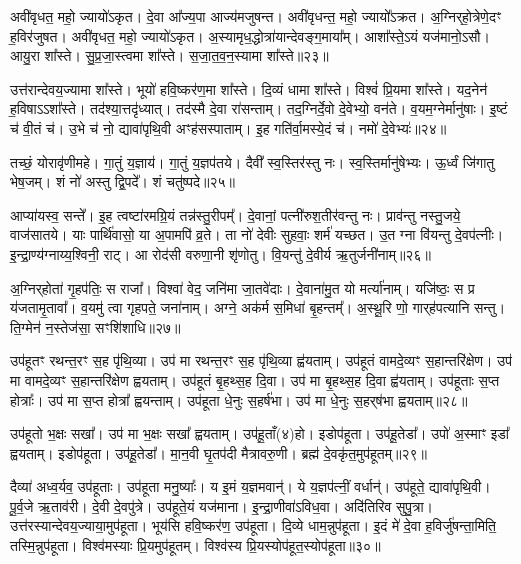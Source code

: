 अवी॑वृधत॒ महो॒ ज्यायो॑ऽकृत।
दे॒वा आ᳚ज्य॒पा आज्य॑मजुषन्त।
अवी॑वृधन्त॒ महो॒ ज्यायो᳚\-ऽक्रत।
अ॒ग्निर्‌\mbox{}हो॒त्रेणे॒दꣳ ह॒विर॑जुषत।
अवी॑वृधत॒ महो॒ ज्यायो॑ऽकृत।
अ॒स्यामृध॒द्धोत्रा॑यान्देवङ्ग॒माया᳚म्।
आशा᳚स्ते॒ऽयं यज॑मानो॒ऽसौ।
आयु॒रा शा᳚स्ते।
सु॒प्र॒जा॒स्त्वमा शा᳚स्ते।
स॒जा॒त॒व॒न॒स्यामा शा᳚स्ते॥२३॥

उत्त॑रान्देवय॒ज्यामा शा᳚स्ते।
भूयो॑ हवि॒ष्कर॑ण॒मा शा᳚स्ते।
दि॒व्यं धामा शा᳚स्ते।
विश्वं॑ प्रि॒यमा शा᳚स्ते।
यद॒नेन॑ ह॒विषा\-ऽऽशा᳚स्ते।
तद॑श्या॒त्तदृ॑ध्यात्।
तद॑स्मै दे॒वा रा॑सन्ताम्।
तद॒ग्निर्दे॒वो दे॒वेभ्यो॒ वन॑ते।
व॒यम॒ग्नेर्मानु॑षाः।
इ॒ष्टं च॑ वी॒तं च॑।
उ॒भे च॑ नो॒ द्यावा॑पृथि॒वी अꣳह॑सस्पाताम्।
इ॒ह गति॑र्वा॒मस्ये॒दं च॑।
नमो॑ दे॒वेभ्यः॑॥२४॥\anuvakamend[अ॒भ॒यं॒ कृता॑वकृता॒ग्निरि॒दꣳ ह॒विर॑जुषत महे॒न्द्र इ॒दꣳ ह॒विर॑जुषत सजातवन॒स्यामा शा᳚स्ते वी॒तं च॒ त्रीणि॑ च]

तच्छं॒ योरावृ॑णीमहे।
गा॒तुं य॒ज्ञाय॑।
गा॒तुं य॒ज्ञप॑तये।
दैवी᳚ स्व॒स्तिर॑स्तु नः।
स्व॒स्तिर्मानु॑षेभ्यः।
ऊ॒र्ध्वं जि॑गातु भेष॒जम्।
शं नो॑ अस्तु द्वि॒पदे᳚।
शं चतु॑ष्पदे॥२५॥\anuvakamend[तच्छं॒ योर॒ष्टौ]

आप्या॑यस्व॒ सन्ते᳚।
इ॒ह त्वष्टा॑रमग्रि॒यं तन्न॑स्तु॒रीपम्᳚।
दे॒वानां॒ पत्नी॑रुश॒तीर॑वन्तु नः।
प्राव॑न्तु नस्तु॒जये॒ वाज॑सातये।
याः पार्थि॑वासो॒ या अ॒पामपि॑ व्र॒ते।
ता नो॑ देवीः सुहवाः॒ शर्म॑ यच्छत।
उ॒त ग्ना वि॑यन्तु दे॒वप॑त्नीः।
इ॒न्द्रा॒ण्य॑ग्नाय्य॒श्विनी॒ राट्।
आ रोद॑सी वरुणा॒नी शृ॑णोतु।
वि॒यन्तु॑ दे॒वीर्य ऋ॒तुर्जनी॑नाम्॥२६॥

अ॒ग्निर्‌\mbox{}होता॑ गृ॒हप॑तिः॒ स राजा᳚।
विश्वा॑ वेद॒ जनि॑मा जा॒तवे॑दाः।
दे॒वाना॑मु॒त यो मर्त्या॑नाम्।
यजि॑ष्ठः॒ स प्र य॑जतामृ॒तावा᳚।
व॒यमु॑ त्वा गृहपते॒ जना॑नाम्।
अग्ने॒ अक॑र्म स॒मिधा॑ बृ॒हन्तम्᳚।
अ॒स्थू॒रि णो॒ गार्‌\mbox{}ह॑पत्यानि सन्तु।
ति॒ग्मेन॑ न॒स्तेज॑सा॒ सꣳशि॑शाधि॥२७॥\anuvakamend[जनी॑नाम॒ष्टौ च॑]

उप॑हूतꣳ रथन्त॒रꣳ स॒ह पृ॑थि॒व्या।
उप॑ मा रथन्त॒रꣳ स॒ह पृ॑थि॒व्या ह्व॑यताम्।
उप॑हूतं वामदे॒व्यꣳ स॒हान्तरि॑क्षेण।
उप॑ मा वामदे॒व्यꣳ स॒हान्तरि॑क्षेण ह्वयताम्।
उप॑हूतं बृ॒हथ्स॒ह दि॒वा।
उप॑ मा बृ॒हथ्स॒ह दि॒वा ह्व॑यताम्।
उप॑हूताः स॒प्त होत्राः᳚।
उप॑ मा स॒प्त होत्रा᳚ ह्वयन्ताम्।
उप॑हूता धे॒नुः स॒हर्\mbox{}ष॑भा।
उप॑ मा धे॒नुः स॒हर्‌\mbox{}ष॑भा ह्वयताम्॥२८॥

उप॑हूतो भ॒क्षः सखा᳚।
उप॑ मा भ॒क्षः सखा᳚ ह्वयताम्।
उप॑हू॒ताँ(४)हो।
इडोप॑हूता।
उप॑हू॒तेडा᳚।
उपो॑ अ॒स्माꣳ इडा᳚ ह्वयताम्।
इडोप॑हूता।
उप॑हू॒तेडा᳚।
मा॒न॒वी घृ॒तप॑दी मैत्रावरु॒णी।
ब्रह्म॑ दे॒वकृ॑त॒मुप॑हूतम्॥२९॥

दैव्या॑ अध्व॒र्यव॒ उप॑हूताः।
उप॑हूता मनु॒ष्याः᳚।
य इ॒मं य॒ज्ञमवान्॑।
ये य॒ज्ञप॑त्नीं॒ वर्धान्॑।
उप॑हूते॒ द्यावा॑पृथि॒वी।
पू॒र्व॒जे ऋ॒ताव॑री।
दे॒वी दे॒वपु॑त्रे।
उप॑हूते॒यं यज॑माना।
इ॒न्द्रा॒णीवा॑\-ऽविध॒वा।
अदि॑तिरिव सुपु॒त्रा।
उत्त॑रस्यान्देवय॒ज्याया॒मुप॑हूता।
भूय॑सि हवि॒ष्कर॑ण॒ उप॑हूता।
दि॒व्ये धाम॒न्नुप॑हूता।
इ॒दं मे॑ दे॒वा ह॒विर्जु॑षन्ता॒मिति॒ तस्मि॒न्नुप॑हूता।
विश्व॑मस्याः प्रि॒यमुप॑हूतम्।
विश्व॑स्य प्रि॒यस्योप॑हूत॒स्योप॑हूता॥३०॥




